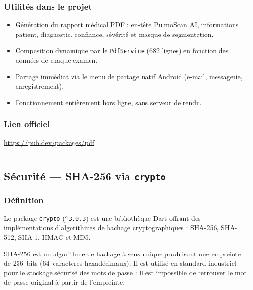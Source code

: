 \documentclass[12pt,a4paper]{report}
\begin{document}
\subsubsection*{Utilités dans le projet}
\begin{itemize}
  \item Génération du rapport médical PDF : en-tête PulmoScan AI, informations patient, diagnostic, confiance, sévérité et masque de segmentation.
  \item Composition dynamique par le \texttt{PdfService} (682 lignes) en fonction des données de chaque examen.
  \item Partage immédiat via le menu de partage natif Android (e-mail, messagerie, enregistrement).
  \item Fonctionnement entièrement hors ligne, sans serveur de rendu.
\end{itemize}

\subsubsection*{Lien officiel}
\url{https://pub.dev/packages/pdf}

\medskip\hrule\medskip

\subsection{Sécurité --- SHA-256 via \texttt{crypto}}

\noindent\begin{minipage}[t]{0.66\textwidth}
\subsubsection*{Définition}
Le package \texttt{crypto} (\texttt{\^{}3.0.3}) est une bibliothèque Dart offrant des implémentations d'algorithmes de hachage cryptographiques : SHA-256, SHA-512, SHA-1, HMAC et MD5.

SHA-256 est un algorithme de hachage à sens unique produisant une empreinte de 256~bits (64~caractères hexadécimaux). Il est utilisé en standard industriel pour le stockage sécurisé des mots de passe : il est impossible de retrouver le mot de passe original à partir de l'empreinte.
\end{minipage}\hfill
\begin{minipage}[t]{0.30\textwidth}
\vspace{0pt}
\begin{center}
\end{center}
\end{minipage}
\end{document}
